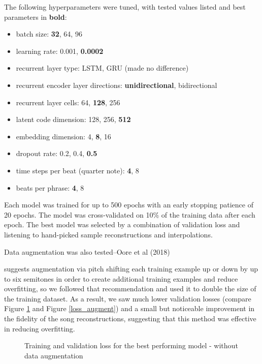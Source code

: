 \documentclass[sigconf,authorversion]{acmart}
\providecommand{\tightlist}{%
  \setlength{\itemsep}{0pt}\setlength{\parskip}{0pt}}
\begin{document}
The following hyperparameters were tuned, with tested values listed
and best parameters in \textbf{bold}:

\begin{itemize}
  \tightlist
  \item batch size: \textbf{32}, 64, 96
  \item learning rate: 0.001, \textbf{0.0002}
  \item recurrent layer type: LSTM, GRU (made no difference)
  \item recurrent encoder layer directions: \textbf{unidirectional}, bidirectional
  \item recurrent layer cells: 64, \textbf{128}, 256
  \item latent code dimension: 128, 256, \textbf{512}
  \item embedding dimension: 4, \textbf{8}, 16
  \item dropout rate: 0.2, 0.4, \textbf{0.5}
  \item time steps per beat (quarter note): \textbf{4}, 8
  \item beats per phrase: \textbf{4}, 8
\end{itemize}

Each model was trained for up to 500 epochs with an early stopping
patience of 20 epochs. The model was cross-validated on 10\% of the
training data after each epoch. The best model was selected by a
combination of validation loss and listening to hand-picked sample
reconstructions and interpolations.

Data augmentation was also tested--Oore et al (2018)

\cite{oore_this_2018} suggests augmentation via pitch shifting each
training example up or down by up to six semitones in order to create
additional training examples and reduce overfitting, so we followed
that recommendation and used it to double the size of the training
dataset. As a result, we saw much lower validation losses (compare
Figure \ref{loss} and Figure \ref{loss_augment}) and a small but
noticeable improvement in the fidelity of the song reconstructions,
suggesting that this method was effective in reducing overfitting.

\begin{figure}[htbp]
    \begin{center}
        \scalebox{0.5}{}
    \end{center}
    \caption{Training and validation loss for the best performing model - without data augmentation}
    \label{loss}
\end{figure}
\end{document}
